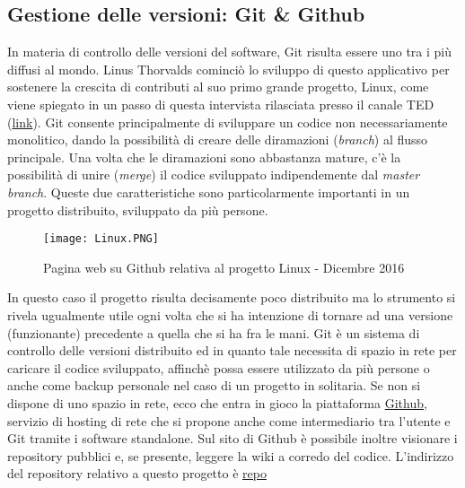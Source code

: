 \documentclass[12pt,a4paper,onecolumn,x11names]{article}
\begin{document}
	\subsection{Gestione delle versioni: Git \& Github}
		\begin{flushleft}
			In materia di controllo delle versioni del software, Git risulta essere uno tra i più diffusi al mondo. Linus Thorvalds cominciò lo sviluppo di questo applicativo per sostenere la crescita di contributi al suo primo grande progetto, Linux, come viene spiegato in un passo di questa intervista rilasciata presso il canale TED (\textsf{\href{http://www.ted.com/talks/linus_torvalds_the_mind_behind_linux}{link}}).\newline
			Git consente principalmente di sviluppare un codice non necessariamente monolitico, dando la possibilità di creare delle diramazioni (\textit{branch}) al flusso principale. Una volta che le diramazioni sono abbastanza mature, c'è la possibilità di unire (\textit{merge}) il codice sviluppato indipendemente dal \textit{master branch}. 
			Queste due caratteristiche sono particolarmente importanti in un progetto distribuito, sviluppato da più persone. 
		\end{flushleft}
	\begin{center}
		\begin{figure}[h]
			\texttt{[image: Linux.PNG]}
			\caption{Pagina web su Github relativa al progetto Linux - Dicembre 2016}
		\end{figure}
	\end{center}
		\begin{flushleft}
			In questo caso il progetto risulta decisamente poco distribuito ma lo strumento si rivela ugualmente utile ogni volta che si ha intenzione di tornare ad una versione (funzionante) precedente a quella che si ha fra le mani.\newline
			Git è un sistema di controllo delle versioni distribuito ed in quanto tale necessita di spazio in rete per caricare il codice sviluppato, affinchè possa essere utilizzato da più persone o anche come backup personale nel caso di un progetto in solitaria. Se non si dispone di uno spazio in rete, ecco che entra in gioco la piattaforma \textsf{\href{https://github.com/}{Github}}, servizio di hosting di rete che si propone anche come intermediario tra l'utente e Git tramite i software standalone. Sul sito di Github è possibile inoltre visionare i repository pubblici e, se presente, leggere la wiki a corredo del codice.\newline\newline
			L'indirizzo del repository relativo a questo progetto è \textsf{\href{https://github.com/dailytowns/ProgettoBasi}{repo}}
		\end{flushleft}
\end{document}
